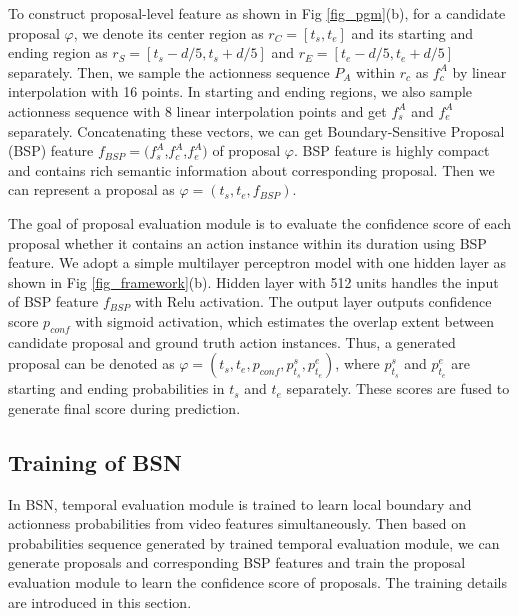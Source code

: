 \documentclass[runningheads]{llncs}
\begin{document}
To construct proposal-level feature as shown in Fig \ref{fig_pgm}(b), for a candidate proposal $\varphi$, we denote its  center region as $r_C=[t_s,t_e]$ and its starting and ending region as $r_S=[ t_s-d/5,t_s+d/5 ]$ and $r_E= [ t_e-d/5,t_e+d/5 ]$ separately. %
%
Then, we sample the actionness sequence $P_A$ within $r_c$ as $f_{c}^A$  by linear interpolation with 16 points. In starting and ending regions, we also sample actionness  sequence with 8 linear  interpolation points and get $f_{s}^A$ and $f_{e}^A$ separately. Concatenating these vectors, we can get Boundary-Sensitive Proposal (BSP) feature $f_{BSP}=(f_s^A$,$f_c^A$,$f_e^A)$ of proposal $\varphi$.
BSP feature is highly compact and contains rich semantic information about corresponding proposal.
Then we can represent a proposal as $\varphi=(t_s,t_e,f_{BSP})$.%

The goal of proposal evaluation module is to evaluate the confidence score of each proposal whether it contains an action instance within its duration using BSP feature. We adopt a simple multilayer perceptron model with one hidden layer as shown in Fig \ref{fig_framework}(b). Hidden layer with 512 units  handles the input of BSP feature $f_{BSP}$ with Relu  activation. The output layer outputs confidence score $p_{conf}$ with sigmoid activation, which estimates the overlap extent between candidate proposal and ground truth action instances. Thus, a generated proposal can be denoted  as $\varphi=(t_s,t_e,p_{conf},p^s_{t_s},p^e_{t_e})$, where $p^s_{t_s}$ and $p^e_{t_e}$ are starting and ending probabilities in $t_s$ and $t_e$ separately. These scores are fused to generate final score during prediction.



\subsection{Training of BSN }

In BSN, temporal evaluation module is trained to learn local boundary and actionness probabilities  from video features simultaneously. Then based on probabilities sequence generated by trained temporal evaluation module, we can generate proposals and corresponding BSP features and train the proposal evaluation module to learn the confidence score of proposals. The training details are introduced in this section.
\end{document}
